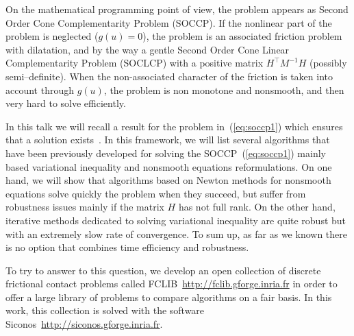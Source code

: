 \documentclass[10pt,a4paper]{article}
\begin{document}
 On the mathematical programming point of view, the problem appears as Second Order Cone Complementarity Problem (SOCCP). If the nonlinear part of the problem is neglected ($g(u)=0$), the problem is an associated friction problem with dilatation, and by the way a gentle Second Order Cone Linear Complementarity Problem (SOCLCP) with a positive matrix $H^\top M^{-1} H$ (possibly semi--definite). When the non-associated character of the friction is taken into account through $g(u)$, the problem is non monotone and nonsmooth, and then very hard to solve efficiently.

In this talk we will recall a result for the problem in~(\ref{eq:soccp1}) which ensures that a solution exists~\cite{ZAMM:ZAMM201000073}. In this framework, we will list several algorithms that have been previously developed for solving the SOCCP~(\ref{eq:soccp1}) mainly based variational inequality and nonsmooth equations reformulations. On one hand, we will show that algorithms based on Newton methods for nonsmooth equations solve quickly the problem when they succeed, but suffer from robustness issues mainly if the matrix $H$ has not full rank. On the other hand, iterative methods dedicated to solving variational inequality are quite robust but with an extremely slow rate of convergence. To sum up, as far as we known there is no option that combines time efficiency and robustness. 

To try to answer to this question, we develop an open collection of discrete frictional contact problems called FCLIB~\url{http://fclib.gforge.inria.fr} in order to offer a large library of problems to compare algorithms on a fair basis.  In this work, this collection is solved with the software {\sc Siconos}~\url{http://siconos.gforge.inria.fr}.
\small


\end{document}
